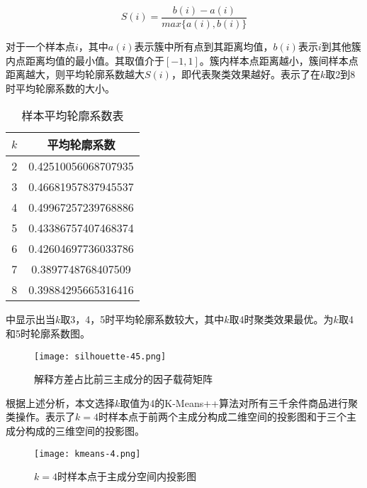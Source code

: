 \documentclass[lang=cn,11pt,a4paper,cite=authoryear]{elegantpaper}
\begin{document}
\begin{equation}
  S(i) = \frac{b(i)-a(i)}{max \{a(i), b(i) \}}
\end{equation}

对于一个样本点$i$，其中$a(i)$表示簇中所有点到其距离均值，$b(i)$表示$i$到其他簇内点距离均值的最小值。其取值介于$[-1, 1]$。簇内样本点距离越小，簇间样本点距离越大，则平均轮廓系数越大$S(i)$，即代表聚类效果越好。表示了在$k$取2到8时平均轮廓系数的大小。
\begin{table}[!htb]
  \centering
  \caption{样本平均轮廓系数表}
    \huge
    \begin{tabular}{c|c}
    \hline
    \textbf{$k$} & \textbf{平均轮廓系数} \\
    \hline
    2 & 0.42510056068707935 \\
    3 & 0.46681957837945537 \\
    4 & 0.49967257239768886 \\
    5 & 0.43386757407468374 \\
    6 & 0.42604697736033786 \\
    7 & 0.3897748768407509  \\
    8 & 0.39884295665316416 \\
    \hline
    \end{tabular}
  \label{平均轮廓系数表}
\end{table}

中显示出当$k$取3，4，5时平均轮廓系数较大，其中$k$取4时聚类效果最优。为$k$取4和5时轮廓系数图。
\begin{figure}[H]
  \centering
  \texttt{[image: silhouette-45.png]}
  \caption{解释方差占比前三主成分的因子载荷矩阵}
  \label{平均轮廓系数}
\end{figure}

根据上述分析，本文选择$k$取值为4的K-Means++算法对所有三千余件商品进行聚类操作。表示了$k=4$时样本点于前两个主成分构成二维空间的投影图和于三个主成分构成的三维空间的投影图。
\begin{figure}[H]
  \centering
  \texttt{[image: kmeans-4.png]}
  \caption{$k=4$时样本点于主成分空间内投影图}
  \label{4聚类二维三维图}
\end{figure}
\end{document}
